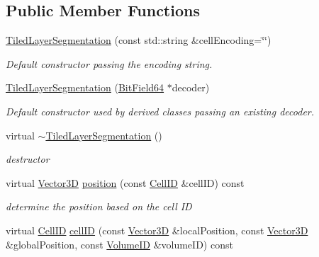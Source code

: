 \subsection*{Public Member Functions}
\begin{DoxyCompactItemize}
\item 
\hyperlink{class_d_d4hep_1_1_d_d_segmentation_1_1_tiled_layer_segmentation_a9f5fb19402d8d5bfbfb6d3db886bdfe3}{TiledLayerSegmentation} (const std::string \&cellEncoding=\char`\"{}\char`\"{})
\begin{DoxyCompactList}\small\item\em Default constructor passing the encoding string. \item\end{DoxyCompactList}\item 
\hyperlink{class_d_d4hep_1_1_d_d_segmentation_1_1_tiled_layer_segmentation_ade81bfe57661f1faf98877b6e4de725e}{TiledLayerSegmentation} (\hyperlink{class_d_d4hep_1_1_d_d_segmentation_1_1_bit_field64}{BitField64} $\ast$decoder)
\begin{DoxyCompactList}\small\item\em Default constructor used by derived classes passing an existing decoder. \item\end{DoxyCompactList}\item 
virtual \hyperlink{class_d_d4hep_1_1_d_d_segmentation_1_1_tiled_layer_segmentation_ac4a4730758ab96a1215fb55999503af2}{$\sim$TiledLayerSegmentation} ()
\begin{DoxyCompactList}\small\item\em destructor \item\end{DoxyCompactList}\item 
virtual \hyperlink{struct_d_d4hep_1_1_d_d_segmentation_1_1_vector3_d}{Vector3D} \hyperlink{class_d_d4hep_1_1_d_d_segmentation_1_1_tiled_layer_segmentation_a4e29a7791d15e076601c3edd0e350fd0}{position} (const \hyperlink{namespace_d_d4hep_1_1_d_d_segmentation_ac7af071d85cb48820914434a07e21ba1}{CellID} \&cellID) const 
\begin{DoxyCompactList}\small\item\em determine the position based on the cell ID \item\end{DoxyCompactList}\item 
virtual \hyperlink{namespace_d_d4hep_1_1_d_d_segmentation_ac7af071d85cb48820914434a07e21ba1}{CellID} \hyperlink{class_d_d4hep_1_1_d_d_segmentation_1_1_tiled_layer_segmentation_a481dd2415b1b931234efbca27617f1dd}{cellID} (const \hyperlink{struct_d_d4hep_1_1_d_d_segmentation_1_1_vector3_d}{Vector3D} \&localPosition, const \hyperlink{struct_d_d4hep_1_1_d_d_segmentation_1_1_vector3_d}{Vector3D} \&globalPosition, const \hyperlink{namespace_d_d4hep_1_1_d_d_segmentation_a61a6833a18d1800bdef176595f83e3ba}{VolumeID} \&volumeID) const 

\end{DoxyCompactItemize}
